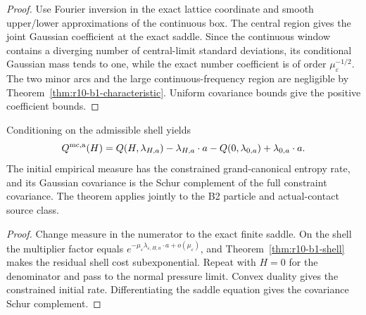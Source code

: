 \begin{proof}
Use Fourier inversion in the exact lattice coordinate and smooth upper/lower
approximations of the continuous box.  The central region gives the joint
Gaussian coefficient at the exact saddle.  Since the continuous window
contains a diverging number of central-limit standard deviations, its
conditional Gaussian mass tends to one, while the exact number coefficient is
of order \(\mu_\varepsilon^{-1/2}\).  The two minor arcs and the large
continuous-frequency region are negligible by
Theorem~\ref{thm:r10-b1-characteristic}.  Uniform covariance bounds give the
positive coefficient bounds.
\end{proof}

\begin{theorem}
\label{thm:r10-b1-main}
Conditioning on the admissible shell yields
\[
 Q^{\rm mc,a}(H)=
 Q(H,\lambda_{H,a})-\lambda_{H,a}\cdot a
 -Q(0,\lambda_{0,a})+\lambda_{0,a}\cdot a.
\]
The initial empirical measure has the constrained grand-canonical entropy
rate, and its Gaussian covariance is the Schur complement of the full
constraint covariance.  The theorem applies jointly to the B2 particle and
actual-contact source class.
\end{theorem}

\begin{proof}
Change measure in the numerator to the exact finite saddle.  On the shell the
multiplier factor equals
\(e^{-\mu_\varepsilon\lambda_{\varepsilon,H,a}\cdot a+o(\mu_\varepsilon)}\),
and Theorem~\ref{thm:r10-b1-shell} makes the residual shell cost
subexponential.  Repeat with \(H=0\) for the denominator and pass to the
normal pressure limit.  Convex duality gives the constrained initial rate.
Differentiating the saddle equation gives the covariance Schur complement.
\end{proof}

